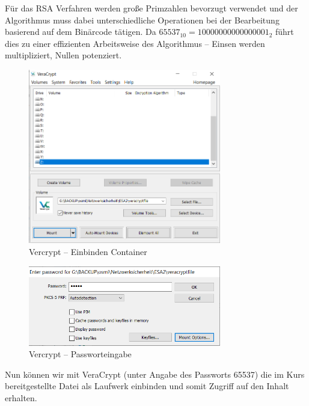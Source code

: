 \documentclass{article}
\begin{document}
Für das RSA Verfahren werden große Primzahlen bevorzugt verwendet und der 
Algorithmus muss dabei unterschiedliche Operationen bei der Bearbeitung basierend 
auf dem Binärcode tätigen. Da $65537_{10} = 10000000000000001_2$ führt 
dies zu einer effizienten Arbeitsweise des Algorithmus – Einsen werden 
multipliziert, Nullen potenziert.

\begin{figure}[H]
	\includegraphics[width=0.75\textwidth]{images/10}
	\centering
	\caption{Vercrypt – Einbinden Container}
\end{figure}

\begin{figure}[H]
	\includegraphics[width=0.75\textwidth]{images/11}
	\centering
	\caption{Vercrypt – Passworteingabe}
\end{figure}

Nun können wir mit VeraCrypt (unter Angabe des Passworts 65537) die im Kurs 
bereitgestellte Datei als Laufwerk einbinden und somit Zugriff auf den Inhalt 
erhalten.
\end{document}
